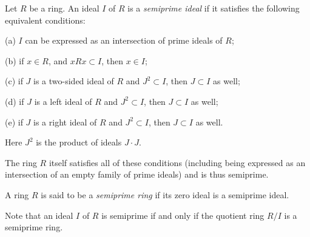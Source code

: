 \documentclass{article}
\begin{document}
Let $R$ be a ring.  
An ideal $I$ of $R$ is a {\it semiprime ideal} 
if it satisfies the following equivalent conditions:

(a) $I$ can be expressed as an intersection of prime ideals of $R$;

(b) if $x \in R$, and $xRx \subset I$, then $x \in I$;

(c) if $J$ is a two-sided ideal of $R$ and $J^2 \subset I$, then $J \subset I$ as well;

(d) if $J$ is a left ideal of $R$ and $J^2 \subset I$, then $J \subset I$ as well;

(e) if $J$ is a right ideal of $R$ and $J^2 \subset I$, then $J \subset I$ as well.

Here $J^2$ is the product of ideals $J \cdot J$.

The ring $R$ itself satisfies all of these conditions (including being expressed as an intersection of an empty family of prime ideals) and is thus semiprime.

A ring $R$ is said to be a {\it semiprime ring} if its zero ideal is a semiprime ideal.

Note that an ideal $I$ of $R$ is semiprime if and only if the quotient ring $R/I$ is a semiprime ring.
\end{document}
